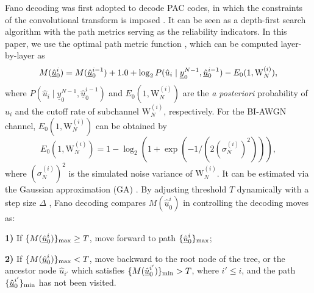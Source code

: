 \documentclass[12pt, draftclsnofoot, peerreview, onecolumn]{IEEEtran}
\theoremstyle{noparent}
\begin{document}
Fano decoding was first adopted to decode PAC codes, in which 
the constraints of the convolutional transform is imposed \cite{Arikan2019sequentialdecodingchannel}.
It can be seen as a depth-first search algorithm with the path metrics serving as the reliability indicators.
In this paper, we use the optimal path metric function \cite{Moradi2021SequentialDecodingMetric}, 
which can be computed layer-by-layer as
\begin{equation}
    M(\underline{\hat{u}}_{0}^{i})=M(\underline{\hat{u}}_{0}^{i-1}) + 1.0 + \log _{2} P(\hat{u}_{i} \mid \underline{y}_{0}^{N-1}, \underline{\hat{u}}_{0}^{i-1})\\
    -E_{0}(1, \mathrm{W}_{N}^{(i)}),
    \label{Fano_metric}
\end{equation}
where $P(\hat{u}_{i} \mid \underline{y}_{0}^{N-1}, \underline{\hat{u}}_{0}^{i-1})$ and 
$E_{0}(1, \mathrm{W}_{N}^{(i)})$ are the \textit{a posteriori} probability of $\hat{u}_{i}$
and the cutoff rate of subchannel $\mathrm{W}_{N}^{(i)}$, respectively.
For the BI-AWGN channel, $E_{0}(1, \mathrm{W}_{N}^{(i)})$ can be 
obtained by \cite{Gallager1968InformationTheoryReliable}
\begin{equation}
        E_{0}(1, \mathrm{W}_{N}^{(i)})=
        1-\log_2(1+\exp(-1/(2(\sigma_N^{(i)})^2))),
        \label{cutoff_rate}
\end{equation}
where $(\sigma_N^{(i)})^2$ is the simulated noise variance of $\mathrm{W}_{N}^{(i)}$. It can be estimated via the Gaussian approximation (GA) \cite{Trifonov2012EfficientDesignDecoding}.
By adjusting threshold $T$ dynamically with a step size $\Delta$ \cite{Fano1963heuristicdiscussionprobabilistic}, Fano decoding compares $M(\underline{\hat{u}}_{0}^{i})$ in controlling the decoding moves as:

\textbf{1)} If $\{M(\underline{\hat{u}}_{0}^{i})\}_{\rm{max}} \ge T $, 
move forward to path $\{\underline{\hat{u}}_{0}^{i}\}_{\rm{max}} $;

\textbf{2)} If $\{M(\underline{\hat{u}}_{0}^{i})\}_{\rm{max}}<T$, 
move backward to the root node of the tree, 
or the ancestor node $\hat{u}_{i'}$ which satisfies
$\{M(\underline{\hat{u}}_{0}^{i'})\}_{\rm{min}} > T $, where $i' \leq i$, and the path 
$\{\underline{\hat{u}}_{0}^{i'}\}_{\rm{min}}$ has not been visited.
\end{document}
